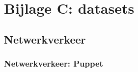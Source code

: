 


\chapter*{Bijlage C: datasets}


\section*{Netwerkverkeer}
\label{dataset:netwerkverkeer}
\subsection*{Netwerkverkeer: Puppet}
\label{dataset:netwerkverkeer:puppet}

